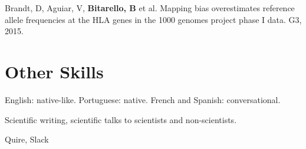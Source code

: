 \documentclass{article}
\begin{document}
Brandt, D, Aguiar, V, \textbf{Bitarello, B} et al. Mapping bias overestimates reference allele
frequencies at the HLA genes in the 1000 genomes project phase I data. G3, 2015.

\section{Other Skills}
\begin{description}[widest=Languages]
\item[Languages]	English: native-like. Portuguese: native.  French and Spanish: conversational.
\item[Communication] Scientific writing, scientific talks to scientists and non-scientists.
\item[Task and time management:] Quire, Slack
\end{description}
\end{document}
